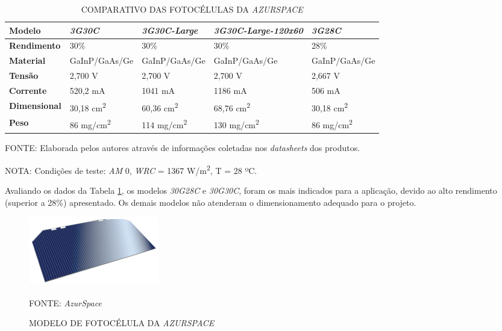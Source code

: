 \documentclass[
	12pt,				%
	openright,			%
	oneside,			%
	a4paper,			%
	english,			%
	french,				%
	spanish,			%
	brazil,				%
	oldfontcommands
	]{abntex2}
\begin{document}
	\begin{table}[th]
	\caption{COMPARATIVO DAS FOTOCÉLULAS DA \textit{AZURSPACE}}
	\label{Tab_Azur_Comp}
	\begin{tabular}{p{2.5cm}|p{3.1cm}|p{3.1cm}|p{3.1cm}|p{3.1cm}}
		\textbf{Modelo} & \textit{\textbf{3G30C}} & \textit{\textbf{3G30C-Large}} & \textit{\textbf{3G30C-Large-120x60}} & \textit{\textbf{3G28C}} \\
		\hline
		\textbf{Rendimento} & 30\% & 30\% & 30\% & 28\% \\
		\hline
		\textbf{Material} & GaInP/GaAs/Ge & GaInP/GaAs/Ge & GaInP/GaAs/Ge & GaInP/GaAs/Ge\\
		\hline
		\textbf{Tensão} & 2,700 V & 2,700 V & 2,700 V & 2,667 V\\
		\hline
		\textbf{Corrente} & 520,2 mA & 1041 mA & 1186 mA & 506 mA\\
		\hline
		\textbf{Dimensional} & 30,18 cm\textsuperscript{2} & 60,36 cm\textsuperscript{2} & 68,76 cm\textsuperscript{2} & 30,18 cm\textsuperscript{2}\\
		\hline
		\textbf{Peso} & 86 mg/cm\textsuperscript{2} & 114 mg/cm\textsuperscript{2} & 130 mg/cm\textsuperscript{2} & 86 mg/cm\textsuperscript{2}\\
	\end{tabular}
	
	\begin{small}
	\vspace{3pt}
		FONTE: Elaborada pelos autores através de informações coletadas nos \textit{datasheets} dos produtos.
	\end{small}
	\begin{footnotesize}
		NOTA: Condições de teste: \textit{AM} 0, \textit{WRC} = 1367 W/m\textsuperscript{2}, T = 28 ºC.
	\end{footnotesize}
	\end{table}	
	
	Avaliando os dados da Tabela \ref{Tab_Azur_Comp}, os modelos \textit{30G28C} e \textit{30G30C}, foram os mais indicados para a aplicação, devido ao alto rendimento (superior a 28\%) apresentado. Os demais modelos não atenderam o dimensionamento adequado para o projeto.
	
	\begin{figure}[th]
		\caption{MODELO DE FOTOCÉLULA DA \textit{AZURSPACE}}
		\label{Fig_Cell_Azur}
		\centering
		\includegraphics[width=0.5\linewidth]{./figs/ZTJ}
			
		\begin{small}
			FONTE: \textit{AzurSpace}\textsuperscript{\cite{AzurSpace2}}
		\end{small}		
	\end{figure}	
	
\end{document}
